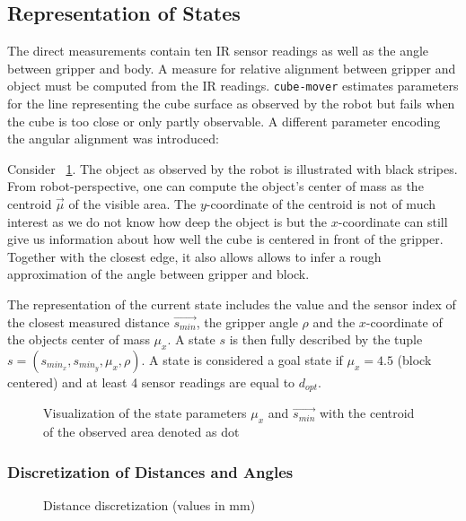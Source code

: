 \subsection{Representation of States}
The direct measurements contain ten IR sensor readings as well as the angle between gripper and body. A measure for relative alignment between gripper and object must be computed from the IR readings. \texttt{cube-mover} estimates parameters for the line representing the cube surface as observed by the robot but fails when the cube is too close or only partly observable. A different parameter encoding the angular alignment was introduced:

Consider \figurename~\ref{fig:s_min_mu}. The object as observed by the robot is illustrated with black stripes. From robot-perspective, one can compute the object's center of mass as the centroid $\vec{\mu}$ of the visible area. The $y$-coordinate of the centroid is not of much interest as we do not know how deep the object is but the $x$-coordinate can still give us information about how well the cube is centered in front of the gripper. Together with the closest edge, it also allows allows to infer a rough approximation of the angle between gripper and block.

The representation of the current state includes the value and the sensor index of the closest measured distance $\vec{s_{min}}$, the gripper angle $\rho$ and the $x$-coordinate of the objects center of mass $\mu_x$. A state $s$ is then fully described by the tuple $s = \left(s_{min_x}, s_{min_y}, \mu_x, \rho \right)$. A state is considered a goal state if $\mu_x = 4.5$ (block centered) and at least 4 sensor readings are equal to $d_{opt}$.

\begin{figure}
    \centering
    \def\svgwidth{0.5 \textwidth}
    
    \caption{Visualization of the state parameters $\mu_x$ and $\vec{s_{min}}$ with the centroid of the observed area denoted as dot}
    \label{fig:s_min_mu}
\end{figure}

\subsubsection{Discretization of Distances and Angles}
\begin{figure}
    \centering
    \def\svgwidth{0.5 \textwidth}
    
    \caption{Distance discretization (values in mm)}
    \label{fig:distances}
\end{figure}

